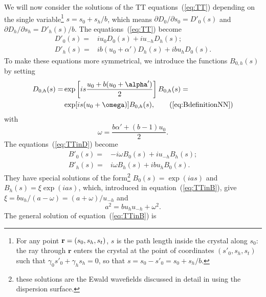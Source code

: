 \documentclass[preprint]{iucr}              %
\begin{document}
We will now consider the solutions of the TT equations~(\ref{eq:TT}) depending on the single variable\footnote{
For any point $\textbf r=(s_0,s_h,s_t)$, $s$ is the path length inside the crystal along $s_0$: the ray through $\textbf{r}$ enters the crystal at the point of coordinates $(s'_0,s_h,s_t)$ such that $\gamma_0 s'_0+\gamma_h s_h = 0$, so that 
$s = s_0 - s'_0 = s_0 + s_h /b$.
}
$s=s_0+s_h / b$, which means 
$\partial D_{0} / \partial  s_{0}=D'_{0}(s)$ and $\partial D_{h} / \partial s_{h}=D'_{h}(s)/b$.
The equations~(\ref{eq:TT}) become
\begin{subequations}
\label{eq:TTinD}
\begin{align}
D'_0(s) =& i u_0 D_0(s) + i u_{-h} D_h(s); \\
D'_h(s) =& i b (u_0 + \alpha') D_h(s) + i b u_{h} D_0(s).
\end{align}
\end{subequations}
To make these equations more symmetrical, we introduce the functions $B_{0,h}(s)$ by setting
\begin{subequations}\label{eq:BdefinitionNN}
\begin{align}
D_{0,h}(s) =& 
\exp \left[ i s \frac{u_0 + b (u_0+\alpha')}{2} \right] B_{0,h}(s) = \nonumber \\ 
&\exp[i s (u_0+\omega)] B_{0,h}(s), \tag{\ref{eq:BdefinitionNN}}
\end{align}
\end{subequations}
with
\begin{equation}\label{eq:omega}
    \omega=\frac{ b \alpha' + (b-1) u_0}{2}.
\end{equation}
The
equations~(\ref{eq:TTinD}) become 
\begin{subequations}
\label{eq:TTinB}
\begin{align}
B'_0(s) =& -i \omega B_0(s) + i u_{-h} B_h(s); \\
B'_h(s) =& i \omega B_h(s) + i b u_{h} B_0(s).
\end{align}
\end{subequations}
They have special solutions of the form\footnote{these solutions are the Ewald wavefields discussed in detail in \cite{authierbook} using the dispersion surface.} $B_0(s)=\exp(i a s)$ and $B_h(s)=\xi \exp(i a s)$, which, introduced in equation~(\ref{eq:TTinB}), give $\xi=bu_h/(a-\omega)=(a+\omega)/u_{-h}$ and 
\begin{equation}\label{eq:a}
    a^2=b u_h u_{-h}+\omega^2.
\end{equation}
The general solution of equation~(\ref{eq:TTinB}) is
\end{document}
